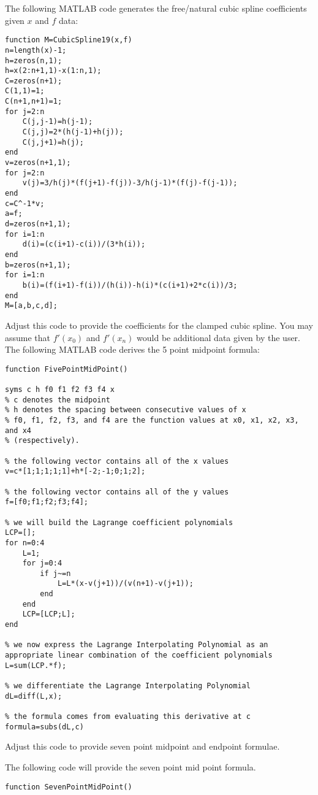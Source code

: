 \documentclass[12 pt, letterpaper]{exam}
\theoremstyle{definition}
\begin{document}
\begin{questions}


\question[35] The following MATLAB code generates the free/natural cubic spline coefficients given $x$ and $f$ data:
\begin{lstlisting}
function M=CubicSpline19(x,f)
n=length(x)-1;
h=zeros(n,1);
h=x(2:n+1,1)-x(1:n,1);
C=zeros(n+1);
C(1,1)=1;
C(n+1,n+1)=1;
for j=2:n
    C(j,j-1)=h(j-1);
    C(j,j)=2*(h(j-1)+h(j));
    C(j,j+1)=h(j);
end
v=zeros(n+1,1);
for j=2:n
    v(j)=3/h(j)*(f(j+1)-f(j))-3/h(j-1)*(f(j)-f(j-1));
end
c=C^-1*v;
a=f;
d=zeros(n+1,1);
for i=1:n
    d(i)=(c(i+1)-c(i))/(3*h(i));
end
b=zeros(n+1,1);
for i=1:n
    b(i)=(f(i+1)-f(i))/(h(i))-h(i)*(c(i+1)+2*c(i))/3;
end
M=[a,b,c,d];
\end{lstlisting}
Adjust this code to provide the coefficients for the clamped cubic spline.  You may assume that $f'(x_0)$ and $f'(x_n)$ would be additional data given by the user.
\question[35] The following MATLAB code derives the 5 point midpoint formula:

\begin{lstlisting}
function FivePointMidPoint()

syms c h f0 f1 f2 f3 f4 x
% c denotes the midpoint
% h denotes the spacing between consecutive values of x
% f0, f1, f2, f3, and f4 are the function values at x0, x1, x2, x3, and x4
% (respectively).

% the following vector contains all of the x values
v=c*[1;1;1;1;1]+h*[-2;-1;0;1;2];

% the following vector contains all of the y values
f=[f0;f1;f2;f3;f4];

% we will build the Lagrange coefficient polynomials
LCP=[];
for n=0:4
    L=1;
    for j=0:4
        if j~=n
            L=L*(x-v(j+1))/(v(n+1)-v(j+1));
        end
    end
    LCP=[LCP;L];
end

% we now express the Lagrange Interpolating Polynomial as an appropriate linear combination of the coefficient polynomials
L=sum(LCP.*f);

% we differentiate the Lagrange Interpolating Polynomial
dL=diff(L,x);

% the formula comes from evaluating this derivative at c
formula=subs(dL,c)
\end{lstlisting}
Adjust this code to provide seven point midpoint and endpoint formulae.
\begin{solution}

The following code will provide the seven point mid point formula.
\begin{lstlisting}
function SevenPointMidPoint()


\end{lstlisting}
\end{solution}
\end{questions}
\end{document}
